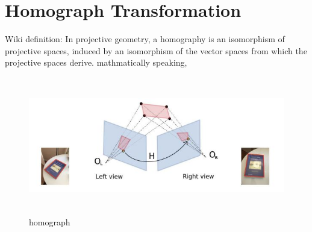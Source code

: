 \documentclass[12pt, a4 paper]{article}
\begin{document}
\section{Homograph Transformation}
Wiki definition: In projective geometry, a homography is an 
isomorphism of projective spaces, induced by an isomorphism 
of the vector spaces from which the projective spaces derive.
mathmatically speaking,

\begin{figure}[h]
    \centering
    \includegraphics[width=12cm,height=6cm]{homography.jpg}
    \caption{homograph}
\end{figure}
\end{document}
